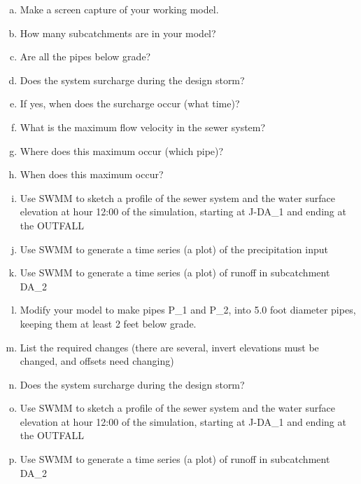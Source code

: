 \documentclass[12pt]{article}
\begin{document}
\begin{enumerate}
\begin{enumerate}[a)]
\item Make a screen capture of your working model. 
\item How many subcatchments are in your model? 
\item Are all the pipes below grade?  
\item Does the system surcharge during the design storm?  
\item If yes, when does the surcharge occur (what time)? 
\item What is the maximum flow velocity in the sewer system?  
\item Where does this maximum occur (which pipe)? 
\item When does this maximum occur?  
\item Use SWMM to sketch a profile of the sewer system and the water surface elevation at hour 12:00 of the simulation, starting at J-DA\_1 and ending at the OUTFALL 
\item Use SWMM to generate a time series (a plot) of the precipitation input  
\item Use SWMM to generate a time series (a plot) of runoff in subcatchment DA\_2   
\item Modify your model to make pipes P\_1 and P\_2, into 5.0 foot diameter pipes, keeping them at least 2 feet below grade.  
\item List the required changes (there are several, invert elevations must be changed, and offsets need changing)
\item Does the system surcharge during the design storm?  
\item Use SWMM to sketch a profile of the sewer system and the water surface elevation at hour 12:00 of the simulation, starting at J-DA\_1 and ending at the OUTFALL
\item Use SWMM to generate a time series (a plot) of runoff in subcatchment DA\_2 
\end{enumerate}
\clearpage



\end{enumerate}
\end{document}
